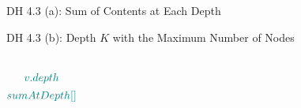 
\begin{frame}{}
  \begin{exampleblock}{DH 4.3 (a): Sum of Contents at Each Depth}
  \end{exampleblock}
\end{frame}

\begin{frame}{}
  
\end{frame}

\begin{frame}{}
  \begin{exampleblock}{DH 4.3 (b): Depth $K$ with the Maximum Number of Nodes}
  \end{exampleblock}
\end{frame}

\begin{frame}{}
  
\end{frame}

\begin{frame}{}
  \begin{columns}
      \[
	\textcolor{teal}{v.depth}
      \]
      \[
	\textcolor{teal}{sumAtDepth[]}
      \]

      \vspace{0.60cm}
      \centerline{}
  \end{columns}
\end{frame}
